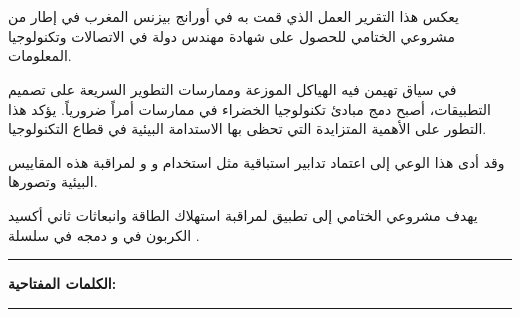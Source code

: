 \chapter*{}

\begin{RLtext}
يعكس هذا التقرير العمل الذي قمت به في أورانج بيزنس المغرب في إطار من مشروعي الختامي للحصول على شهادة مهندس دولة في الاتصالات وتكنولوجيا المعلومات.

 في سياق تهيمن فيه الهياكل الموزعة وممارسات التطوير السريعة على تصميم التطبيقات، أصبح دمج مبادئ تكنولوجيا الخضراء في ممارسات  أمراً ضرورياً. يؤكد هذا التطور على الأهمية المتزايدة التي تحظى بها الاستدامة البيئية في قطاع التكنولوجيا.
  
 وقد أدى هذا الوعي إلى اعتماد تدابير استباقية مثل استخدام  و  و  لمراقبة هذه المقاييس البيئية وتصورها.
 
 يهدف مشروعي الختامي إلى تطبيق  لمراقبة استهلاك الطاقة وانبعاثات ثاني أكسيد الكربون في  و دمجه في سلسلة .
\end{RLtext}

\noindent\rule[2pt]{\textwidth}{0.5pt}

\begin{RLtext} 

{\textbf{الكلمات المفتاحية:}} 
\\

\end{RLtext}

\noindent\rule[2pt]{\textwidth}{0.5pt}
